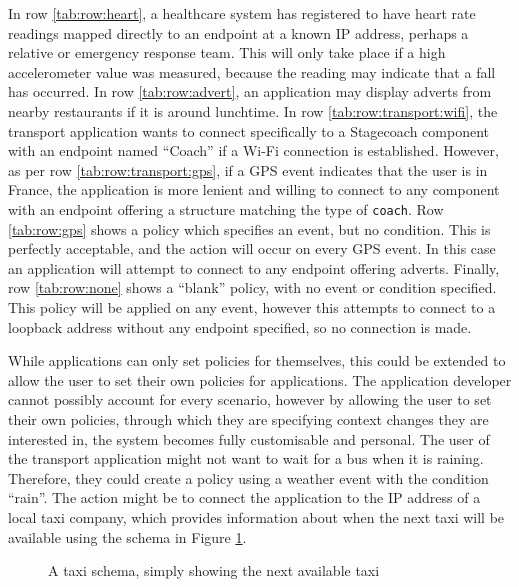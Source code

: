 \documentclass[12pt,twoside,notitlepage]{report}
\begin{document}
In row \ref{tab:row:heart}, a healthcare system has registered to have heart rate readings mapped directly to an endpoint at a known IP address, perhaps a relative or emergency response team. 
This will only take place if a high accelerometer value was measured, because the reading may indicate that a fall has occurred.  
In row \ref{tab:row:advert}, an application may display adverts from nearby restaurants if it is around lunchtime. 
In row \ref{tab:row:transport:wifi}, the transport application wants to connect specifically to a Stagecoach component with an endpoint named ``Coach'' if a Wi-Fi connection is established. 
However, as per row \ref{tab:row:transport:gps}, if a GPS event indicates that the user is in France, the application is more lenient and willing to connect to any component with an endpoint offering a structure matching the type of {\tt coach}. 
Row \ref{tab:row:gps} shows a policy which specifies an event, but no condition. 
This is perfectly acceptable, and the action will occur on every GPS event. 
In this case an application will attempt to connect to any endpoint offering adverts. 
Finally, row \ref{tab:row:none} shows a ``blank'' policy, with no event or condition specified.  
This policy will be applied on any event, however this attempts to connect to a loopback address without any endpoint specified, so no connection is made. 

While applications can only set policies for themselves, this could be extended to allow the user to set their own policies for applications. 
The application developer cannot possibly account for every scenario, however by allowing the user to set their own policies, through which they are specifying context changes they are interested in, the system becomes fully customisable and personal. 
The user of the transport application might not want to wait for a bus when it is raining. 
Therefore, they could create a policy using a weather event with the condition ``rain''. 
The action might be to connect the application to the IP address of a local taxi company, which provides information about when the next taxi will be available using the schema in Figure \ref{fig:taxi-schema-eval}.

\begin{figure}

\caption[Example Schema for a Taxi]{A taxi schema, simply showing the next available taxi}
\label{fig:taxi-schema-eval}
\end{figure}

\end{document}
